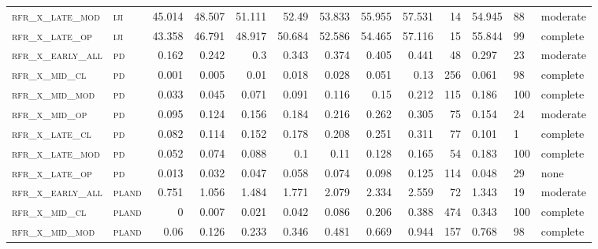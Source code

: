 \begin{landscape}
\begin{center}
\begin{footnotesize}
\begin{longtable}{llrrrrr|rrr}
\textsc{rfr\_x\_late\_mod } & \textsc{iji       }   & 45.014  & 48.507  & 51.111  & 52.49    & 53.833   & 55.955   & 57.531   & 14     & 54.945        & 88            & moderate        \\
\textsc{rfr\_x\_late\_op  } & \textsc{iji       }   & 43.358  & 46.791  & 48.917  & 50.684   & 52.586   & 54.465   & 57.116   & 15     & 55.844        & 99            & complete        \\
\textsc{rfr\_x\_early\_all} & \textsc{pd        }   & 0.162   & 0.242   & 0.3     & 0.343    & 0.374    & 0.405    & 0.441    & 48     & 0.297         & 23            & moderate        \\
\textsc{rfr\_x\_mid\_cl   } & \textsc{pd        }   & 0.001   & 0.005   & 0.01    & 0.018    & 0.028    & 0.051    & 0.13     & 256    & 0.061         & 98            & complete        \\
\textsc{rfr\_x\_mid\_mod  } & \textsc{pd        }   & 0.033   & 0.045   & 0.071   & 0.091    & 0.116    & 0.15     & 0.212    & 115    & 0.186         & 100           & complete        \\
\textsc{rfr\_x\_mid\_op   } & \textsc{pd        }   & 0.095   & 0.124   & 0.156   & 0.184    & 0.216    & 0.262    & 0.305    & 75     & 0.154         & 24            & moderate        \\
\textsc{rfr\_x\_late\_cl  } & \textsc{pd        }   & 0.082   & 0.114   & 0.152   & 0.178    & 0.208    & 0.251    & 0.311    & 77     & 0.101         & 1             & complete        \\
\textsc{rfr\_x\_late\_mod } & \textsc{pd        }   & 0.052   & 0.074   & 0.088   & 0.1      & 0.11     & 0.128    & 0.165    & 54     & 0.183         & 100           & complete        \\
\textsc{rfr\_x\_late\_op  } & \textsc{pd        }   & 0.013   & 0.032   & 0.047   & 0.058    & 0.074    & 0.098    & 0.125    & 114    & 0.048         & 29            & none        \\
\textsc{rfr\_x\_early\_all} & \textsc{pland     }   & 0.751   & 1.056   & 1.484   & 1.771    & 2.079    & 2.334    & 2.559    & 72     & 1.343         & 19            & moderate        \\
\textsc{rfr\_x\_mid\_cl   } & \textsc{pland     }   & 0       & 0.007   & 0.021   & 0.042    & 0.086    & 0.206    & 0.388    & 474    & 0.343         & 100           & complete        \\
\textsc{rfr\_x\_mid\_mod  } & \textsc{pland     }   & 0.06    & 0.126   & 0.233   & 0.346    & 0.481    & 0.669    & 0.944    & 157    & 0.768         & 98            & complete        \\

\end{longtable}
\end{footnotesize}
\end{center}
\end{landscape}
